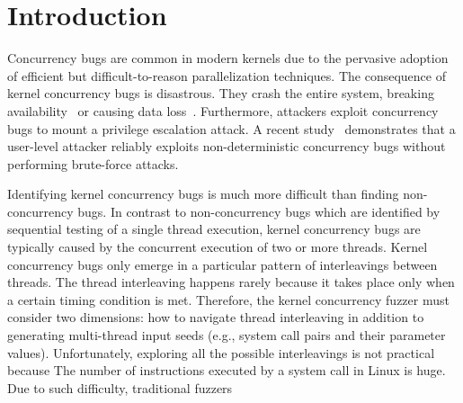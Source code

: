 \section{Introduction}
\label{s:intro}


Concurrency bugs are common in modern kernels due to 
the pervasive adoption of efficient but difficult-to-reason
parallelization techniques.
The consequence of kernel concurrency bugs is disastrous. They crash
the entire system, breaking availability~\cite{cve201812232, snowboardbug} or causing data loss~\cite{dataloss}.
Furthermore, attackers 
exploit concurrency bugs to mount a privilege escalation attack.
A recent study~\cite{exprace} demonstrates that a user-level attacker 
reliably exploits non-deterministic concurrency bugs without performing
brute-force attacks.

Identifying kernel concurrency bugs is much more difficult than 
finding non-concurrency bugs. 
In contrast to non-concurrency bugs which are identified by 
sequential testing of a single thread execution,
kernel concurrency bugs are typically caused by the concurrent execution 
of two or more threads. 
Kernel concurrency bugs only emerge in a particular pattern of 
interleavings between threads. The thread interleaving happens 
rarely because it takes place only when a certain timing condition is met.
Therefore, the kernel concurrency fuzzer must consider two dimensions: 
how to navigate thread interleaving in addition to generating multi-thread input seeds (e.g., system call pairs and their parameter values).
Unfortunately, exploring all the possible interleavings is not practical because 
The number of instructions executed by a system call in Linux is huge.
Due to such difficulty, traditional fuzzers

